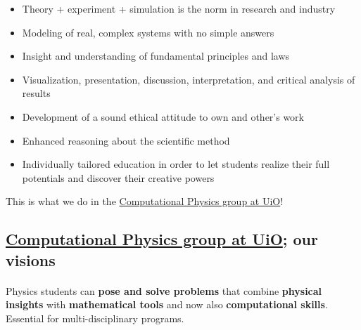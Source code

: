 \documentclass[%
twoside,                 %
final,                   %
10pt]{article}
\begin{document}
\begin{itemize}
\item Theory + experiment + simulation is the norm in research and industry

\item Modeling of real, complex systems with no simple answers

\item Insight and understanding of fundamental principles and laws

\item Visualization, presentation, discussion, interpretation, and critical analysis of results

\item Development of a sound ethical attitude to own and other's work

\item Enhanced reasoning about the scientific method

\item Individually tailored education in order to let students  realize their full potentials and discover their creative powers
\end{itemize}

\noindent
This is what we do in the \href{{http://www.mn.uio.no/fysikk/english/research/groups/computational/index.html}}{Computational Physics group at UiO}!




\subsection{\href{{http://www.mn.uio.no/fysikk/english/research/groups/computational/index.html}}{Computational Physics group at UiO}; our visions}


\paragraph{}
Physics students can \textbf{pose and solve problems} that combine \textbf{physical insights} with \textbf{mathematical tools} and now also \textbf{computational skills}.
Essential for multi-disciplinary programs.
\end{document}
